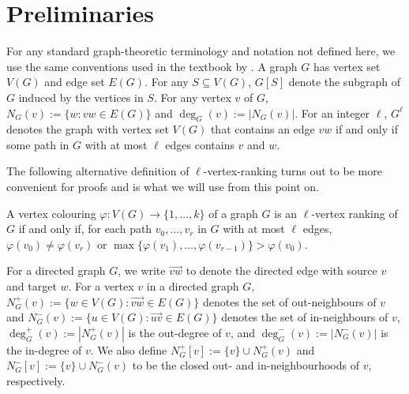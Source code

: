 \documentclass{patmorin}
\begin{document}





\section{Preliminaries}

For any standard graph-theoretic terminology and notation not defined here, we use the same conventions used in the textbook by \citet{diestel:graph}.  A graph $G$ has vertex set $V(G)$ and edge set $E(G)$.  For any $S\subseteq V(G)$, $G[S]$ denote the subgraph of $G$ induced by the vertices in $S$.  For any vertex $v$ of $G$, $N_G(v):=\{w:vw\in E(G)\}$ and $\deg_G(v):=|N_G(v)|$.  For an integer $\ell$, $G^\ell$ denotes the graph with vertex set $V(G)$ that contains an edge $vw$ if and only if some path in $G$ with at most $\ell$ edges contains $v$ and $w$.

The following alternative definition of $\ell$-vertex-ranking turns out to be more convenient for proofs and is what we will use from this point on.
\begin{obs}\label{alternate_def}
  A vertex colouring $\varphi:V(G)\to\{1,\ldots,k\}$ of a graph $G$ is an $\ell$-vertex ranking of $G$ if and only if, for each path $v_0,\ldots,v_r$ in $G$ with at most $\ell$ edges, $\varphi(v_0)\neq \varphi(v_r)$ or $\max\{\varphi(v_1),\ldots,\varphi(v_{r-1})\}>\varphi(v_0)$.
\end{obs}

For a directed graph $G$, we write $\overrightarrow{vw}$ to denote the directed edge with source $v$ and target $w$.  For a vertex $v$ in a directed graph $G$, $N^+_{G}(v):=\{w\in V(G):\overrightarrow{vw}\in E(G)\}$ denotes the set of out-neighbours of $v$ and $N^-_G(v):=\{u\in V(G):\overrightarrow{uv}\in E(G)\}$ denotes the set of in-neighbours of $v$, $\deg^+_{G}(v):=|N^+_G(v)|$ is the out-degree of $v$, and $\deg^-_{G}(v):=|N^-_G(v)|$ is the in-degree of $v$. We also define $N^+_{G}[v]:=\{v\}\cup N^+_{G}(v)$ and $N^-_{G}[v]:=\{v\}\cup N^-_{G}(v)$ to be the closed out- and in-neighbourhoods of $v$, respectively.
\end{document}
